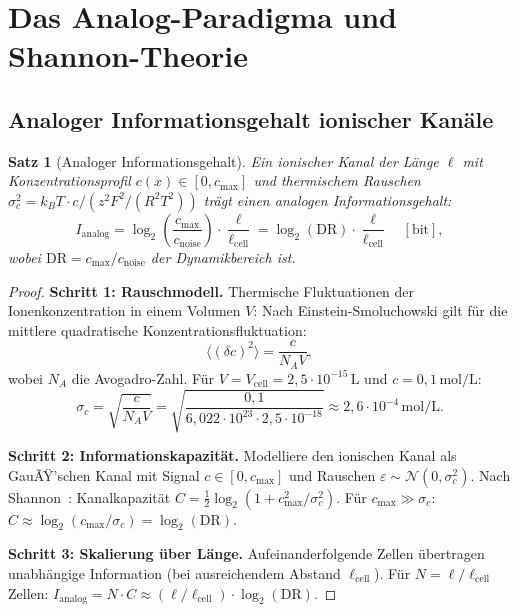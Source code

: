 ﻿\documentclass[a4paper,12pt]{article}
\theoremstyle{plain}
\newtheorem{satz}{Satz}
\theoremstyle{definition}
\theoremstyle{remark}
\begin{document}
\section{Das Analog-Paradigma und Shannon-Theorie}

\subsection{Analoger Informationsgehalt ionischer Kan\"ale}

\begin{satz}[Analoger Informationsgehalt]
\label{satz:analog_info}
Ein ionischer Kanal der L\"ange $\ell$ mit Konzentrationsprofil
$c(x) \in [0, c_{\max}]$ und thermischem Rauschen
$\sigma_c^2 = k_B T \cdot c / (z^2 F^2 / (R^2 T^2))$ tr\"agt
einen analogen Informationsgehalt:
\[
I_{\mathrm{analog}} = \log_2\!\left(\frac{c_{\max}}{c_{\mathrm{noise}}}\right) \cdot \frac{\ell}{\ell_{\mathrm{cell}}}
= \log_2(\mathrm{DR}) \cdot \frac{\ell}{\ell_{\mathrm{cell}}} \quad [\mathrm{bit}],
\]
wobei $\mathrm{DR} = c_{\max}/c_{\mathrm{noise}}$ der \emph{Dynamikbereich} ist.
\end{satz}

\begin{proof}
\textbf{Schritt 1: Rauschmodell.}
Thermische Fluktuationen der Ionenkonzentration in einem Volumen $V$:
Nach Einstein-Smoluchowski gilt f\"ur die mittlere quadratische Konzentrationsfluktuation:
\[
\langle (\delta c)^2 \rangle = \frac{c}{N_A V},
\]
wobei $N_A$ die Avogadro-Zahl.
F\"ur $V = V_{\mathrm{cell}} = 2{,}5 \cdot 10^{-15}\,\text{L}$ und
$c = 0{,}1\,\text{mol/L}$:
\[
\sigma_c = \sqrt{\frac{c}{N_A V}} = \sqrt{\frac{0{,}1}{6{,}022 \cdot 10^{23} \cdot 2{,}5 \cdot 10^{-18}}}
\approx 2{,}6 \cdot 10^{-4}\,\text{mol/L}.
\]

\textbf{Schritt 2: Informationskapazit\"at.}
Modelliere den ionischen Kanal als GauÃŸ'schen Kanal mit Signal $c \in [0, c_{\max}]$
und Rauschen $\varepsilon \sim \mathcal{N}(0, \sigma_c^2)$.
Nach Shannon~\cite{shannon1948}: Kanalkapazit\"at
$C = \frac{1}{2}\log_2(1 + c_{\max}^2/\sigma_c^2)$.
F\"ur $c_{\max} \gg \sigma_c$: $C \approx \log_2(c_{\max}/\sigma_c) = \log_2(\mathrm{DR})$.

\textbf{Schritt 3: Skalierung \"uber L\"ange.}
Aufeinanderfolgende Zellen \"ubertragen unabh\"angige Information
(bei ausreichendem Abstand $\ell_{\mathrm{cell}}$).
F\"ur $N = \ell/\ell_{\mathrm{cell}}$ Zellen:
$I_{\mathrm{analog}} = N \cdot C \approx (\ell/\ell_{\mathrm{cell}}) \cdot \log_2(\mathrm{DR})$.
\end{proof}
\end{document}
